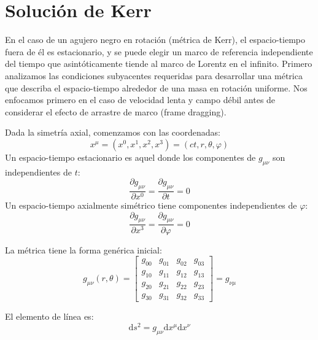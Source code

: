 \section{Solución de Kerr}
\noindent En el caso de un agujero negro en rotación (métrica de Kerr), el espacio-tiempo fuera de él es estacionario, y se puede elegir un marco de referencia independiente del tiempo que asintóticamente tiende al marco de Lorentz en el infinito.
Primero analizamos las condiciones subyacentes requeridas para desarrollar una métrica que describa el espacio-tiempo alrededor de una masa en rotación uniforme. Nos enfocamos primero en el caso de velocidad lenta y campo débil antes de considerar el efecto de arrastre de marco (frame dragging).

Dada la simetría axial, comenzamos con las coordenadas:
\begin{equation}
    x^\mu = \left(x^0, x^1, x^2, x^3\right) = (c t, r, \theta, \varphi)
\end{equation}
Un espacio-tiempo estacionario es aquel donde los componentes de $g_{\mu\nu}$ son independientes de $t$:
\begin{equation}
    \frac{\partial g_{\mu\nu}}{\partial x^0} = \frac{\partial g_{\mu\nu}}{\partial t} = 0
\end{equation}
Un espacio-tiempo axialmente simétrico tiene componentes independientes de $\varphi$:
\begin{equation}
    \frac{\partial g_{\mu\nu}}{\partial x^3} = \frac{\partial g_{\mu\nu}}{\partial \varphi} = 0
\end{equation}

La métrica tiene la forma genérica inicial:
\begin{equation}
    g_{\mu\nu}(r, \theta) = \begin{bmatrix}
        g_{00} & g_{01} & g_{02} & g_{03} \\
        g_{10} & g_{11} & g_{12} & g_{13} \\
        g_{20} & g_{21} & g_{22} & g_{23} \\
        g_{30} & g_{31} & g_{32} & g_{33}
    \end{bmatrix} = g_{\nu\mu}
\end{equation}

El elemento de línea es:
\begin{equation}
    \mathrm{d}s^2 = g_{\mu\nu} \mathrm{d}x^\mu \mathrm{d}x^\nu
\end{equation}

